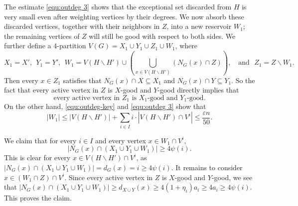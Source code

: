 \documentclass{aic}
\begin{document}
	The estimate \eqref{equ:outdeg 3} shows that the exceptional set discarded from $H$ is very small even after weighting vertices by their degrees.
	We now absorb these discarded vertices, together with their neighbors in $Z$, into a new reservoir $W_1$; the remaining vertices of $Z$ will still be good with respect to both sides.
	We further define a 4-partition $V(G)=X_1\cup Y_1\cup Z_1\cup W_1$,
	where $$X_1=X', ~~Y_1=Y', ~~W_1=V(H\backslash H')\cup \left(\bigcup_{x\in V(H\backslash H')} (N_G(x)\cap Z)\right), \mbox{ ~~and~ } Z_1=Z\backslash W_1.$$
	Then every $x\in Z_1$ satisfies that $N_G(x)\cap X\subseteq X_1$ and $N_G(x)\cap Y\subseteq Y_1$.
	So the fact that every active vertex in $Z$ is $X$-good and $Y$-good directly implies that
	\begin{equation}\label{equ:outdeg 4}
		\text{every active vertex in } Z_1 \text{ is } X_1\text{-good and } Y_1\text{-good}.
	\end{equation}
	On the other hand, \eqref{equ:outdeg-key} and \eqref{equ:outdeg 3} show that
	\begin{equation}\label{equ:outdeg D'}
		|W_1|\leq |V(H\backslash H')|+\sum_{i\in I} i\cdot|V(H\backslash H')\cap V^i|\le \frac{\varepsilon n}{50}.
	\end{equation}
	
	We claim that for every $i\in I$ and every vertex $x\in W_1\cap V^i$,
	\begin{equation}\label{equ:outdeg 5}
		|N_G(x)\cap (X_1\cup Y_1\cup W_1)|\ge 4\psi(i).
	\end{equation}
	This is clear for every $x\in V(H\backslash H')\cap V^i$, as $|N_G(x)\cap (X_1\cup Y_1\cup W_1)|=d_G(x)=i\geq 4\psi(i)$.
	It remains to consider $x\in (W_1\cap Z)\cap V^i$.
	Since every active vertex in $Z$ is $X$-good and $Y$-good,
	we see that
	$|N_G(x)\cap (X_1\cup Y_1\cup W_1)|\geq d_{X\cup Y}(x)\ge 4(1+\eta_i)a_i\ge 4 a_i\ge 4\psi(i)$. This proves the claim.
	
\end{document}
